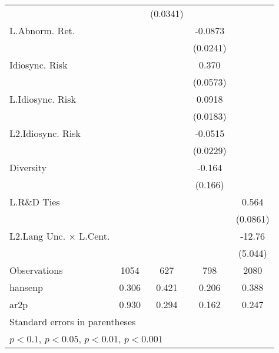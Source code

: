 {\begin{tabular}{l*{4}{c}}
                    &                     &    (0.0341)         &                     &                     \\
L.Abnorm. Ret.      &                     &                     &     -0.0873\sym{***}&                     \\
                    &                     &                     &    (0.0241)         &                     \\
Idiosync. Risk      &                     &                     &       0.370\sym{***}&                     \\
                    &                     &                     &    (0.0573)         &                     \\
L.Idiosync. Risk    &                     &                     &      0.0918\sym{***}&                     \\
                    &                     &                     &    (0.0183)         &                     \\
L2.Idiosync. Risk   &                     &                     &     -0.0515\sym{*}  &                     \\
                    &                     &                     &    (0.0229)         &                     \\
Diversity           &                     &                     &      -0.164         &                     \\
                    &                     &                     &     (0.166)         &                     \\
L.R\&D Ties         &                     &                     &                     &       0.564\sym{***}\\
                    &                     &                     &                     &    (0.0861)         \\
L2.Lang Unc. $\times$ L.Cent.&                     &                     &                     &      -12.76\sym{*}  \\
                    &                     &                     &                     &     (5.044)         \\
\hline
Observations        &        1054         &         627         &         798         &        2080         \\
hansenp             &       0.306         &       0.421         &       0.206         &       0.388         \\
ar2p                &       0.930         &       0.294         &       0.162         &       0.247         \\
\hline\hline
\multicolumn{5}{l}{\footnotesize Standard errors in parentheses}\\
\multicolumn{5}{l}{\footnotesize \sym{+} \(p<0.1\), \sym{*} \(p<0.05\), \sym{**} \(p<0.01\), \sym{***} \(p<0.001\)}\\
\end{tabular}
}
